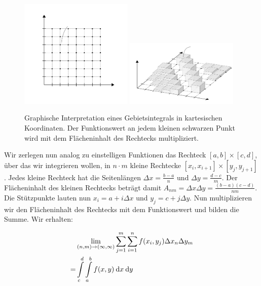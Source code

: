 \begin{figure}
    \centering
    \includegraphics[width=0.48\textwidth]{./svg/integral-2d-cartesian}
    \includegraphics[width=0.48\textwidth]{./svg/integral-2d-cartesian-perspective}
    \caption[Gebietsintegral in kartesischen Koordinaten]{Graphische Interpretation eines Gebietsintegrals in kartesischen Koordinaten. Der Funktionswert an jedem kleinen schwarzen Punkt wird mit dem Flächeninhalt des Rechtecks multipliziert.}
    \label{fig:AreaIntegCartesian}
\end{figure}

Wir zerlegen nun analog zu einstelligen Funktionen das Rechteck $[a,b] \times [c,d]$, über das wir integrieren wollen, in $n\cdot m $ kleine Rechtecke $[x_i,x_{i+1}] \times [y_j,y_{j+1}]$. Jedes kleine Rechteck hat die Seitenlängen $\Delta x = \frac{b-a}{n}$ und $\Delta y = \frac{d-c}{m}$. Der Flächeninhalt des kleinen Rechtecks beträgt damit $A_{nm} = \Delta x \Delta y = \frac{(b-a)(c-d)}{nm}$. Die Stützpunkte lauten nun $x_i = a + i \Delta x$ und $y_j = c + j \Delta y$.  Nun multiplizieren wir den Flächeninhalt des Rechtecks mit dem Funktionswert und bilden die Summe. Wir erhalten:

\begin{center}
    \begin{alignat*}{1}
          & \lim\limits_{(n,m) \to (\infty, \infty)} \sum\limits_{j=1}^m \sum\limits_{i=1}^n f(x_i,y_j) \Delta x_n \Delta y_m  \\
        = & \int\limits_c^d \int\limits_a^b f(x,y) \:\mathrm{d}{x} \:\mathrm{d}{y}
    \end{alignat*}
\end{center}

